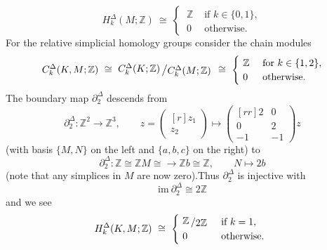 \documentclass[11pt]{book}
\numberwithin{dummy}{section}
\theoremstyle{nonumberbreak}
\newenvironment{sol}[1][]{\ifthenelse{\equal{#1}{}}{\solution}{\solution[#1]}\rm}{\endsolution}
\newenvironment{prob}[1][]{\ifthenelse{\equal{#1}{}}{\problem}{\problem[#1]}\rm}{\endproblem}
\newcommand{\la}{\longrightarrow}
\newcommand{\Z}{\mathbb{Z}}
\newcommand{\slant}[2]{{\raisebox{.1em}{$#1$}\left/\raisebox{-.1em}{$#2$}\right.}}
\begin{document}
\begin{spacing}{1.4}
\begin{prob}
\begin{sol}
\begin{compactenum}
$$H_k^{\Delta}(M;\Z) \ \cong \ \begin{cases} \ \Z & \textrm{ if } k\in \{0,1\}, \\  \ 0 & \textrm{ otherwise.} \end{cases}$$
For the relative simplicial homology groups consider the chain modules
$$C_k^{\Delta}(K,M;\Z) \ \cong \ \slant{C_k^{\Delta}(K;\Z)}{C_k^{\Delta}(M;\Z)} \ \cong \ \begin{cases} \ \Z & \textrm{ for } k \in \{1,2\}, \\ \ 0 & \textrm{ otherwise. } \end{cases}$$
The boundary map $\partial_2^{\Delta}$ descends from 
$$\partial_2^{\Delta}: \Z^2 \la \Z^3, \qquad z=\begin{pmatrix}[r] z_1 \\[-6pt]z_2\end{pmatrix} \mapsto \begin{pmatrix}[rr]2 & 0 \\[-6pt] 0 & 2 \\[-6pt] -1 & -1 \end{pmatrix} z$$
(with basis $\{M,N\}$ on the left and $\{a,b,c\}$ on the right) to 
$$\partial_2^{\Delta}: \Z \cong \Z M \cong \la \Z b \cong \Z, \qquad N \mapsto 2b$$
(note that any simplices in $M$ are now zero).Thus $\partial_2^{\Delta}$ is injective with
$$\mathrm{im} \ \partial_2^{\Delta} \cong  2 \Z$$
and we see
$$H_k^{\Delta}(K,M;\Z) \ \cong \ \begin{cases} \ \slant{\Z}{2\Z} & \textrm{ if }k=1, \\ \ 0 & \textrm{ otherwise. } \end{cases}$$


\end{compactenum}
\end{sol}
\end{prob}
\end{spacing}
\end{document}
